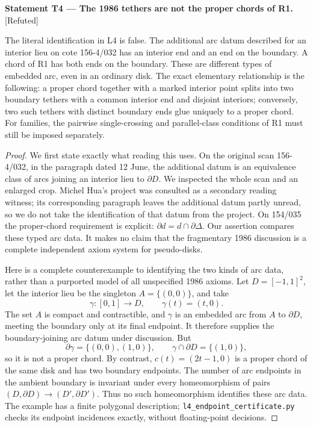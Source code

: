 \documentclass[11pt,a4paper]{article}
\newenvironment{resultenv}[3]{\par\medskip\phantomsection\label{#1}\noindent\textbf{Statement #1 --- #3.}\quad\textsf{[#2]}\par\smallskip\noindent\ignorespaces}{\par\medskip}
\begin{document}
\begin{resultenv}{T4}{Refuted}{The 1986 tethers are not the proper chords of R1}
The literal identification in L4 is false. The additional arc datum
described for an interior lieu on cote 156-4/032 has an interior end
and an end on the boundary. A chord of R1 has both ends on the boundary.
These are different types of embedded arc, even in an ordinary disk.
The exact elementary relationship is the following: a proper chord
together with a marked interior point splits into two boundary tethers
with a common interior end and disjoint interiors; conversely, two
such tethers with distinct boundary ends glue uniquely to a proper
chord. For families, the pairwise single-crossing and parallel-class
conditions of R1 must still be imposed separately.
\end{resultenv}
\begin{proof}
We first state exactly what reading this uses. On the original scan
156-4/032, in the paragraph dated 12 June, the additional datum is an
equivalence class of arcs joining an interior lieu to $\partial D$.
We inspected the whole scan and an enlarged crop. Michel Hua's project
was consulted as a secondary reading witness; its corresponding
paragraph leaves the additional datum partly unread, so we do not
take the identification of that datum from the project. On 154/035
the proper-chord requirement is explicit:
$\partial d=d\cap\partial\Delta$. Our assertion compares these typed
arc data. It makes no claim that the fragmentary 1986 discussion is
a complete independent axiom system for pseudo-disks.

Here is a complete counterexample to identifying the two kinds of
arc data, rather than a purported model of all unspecified 1986 axioms.
Let $D=[-1,1]^2$, let the interior lieu be the singleton
$A=\{(0,0)\}$, and take
\[
 \gamma:[0,1]\longrightarrow D,\qquad\gamma(t)=(t,0).
\]
The set $A$ is compact and contractible, and $\gamma$ is an embedded
arc from $A$ to $\partial D$, meeting the boundary only at its final
endpoint. It therefore supplies the boundary-joining arc datum
under discussion. But
\[
 \partial\gamma=\{(0,0),(1,0)\},\qquad
 \gamma\cap\partial D=\{(1,0)\},
\]
so it is not a proper chord. By contrast,
$c(t)=(2t-1,0)$ is a proper chord of the same disk and has two
boundary endpoints. The number of arc endpoints in the ambient
boundary is invariant under every homeomorphism of pairs
$(D,\partial D)\to(D',\partial D')$. Thus no such homeomorphism
identifies these arc data. The example has a finite polygonal
description; \texttt{l4\_endpoint\_certificate.py} checks its endpoint
incidences exactly, without floating-point decisions.


\end{proof}
\end{document}
